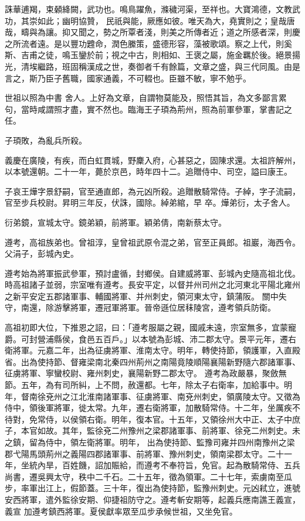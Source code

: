 \begin{pinyinscope}
 誅華逋羯，束顙絳闕，武功也。鳴鳥躍魚，滌穢河渠，至祥也。大寶鴻德，文教武功，其崇如此；幽明協贊，
 民祇與能，厥應如彼。唯天為大，堯實則之；皇哉唐哉，疇與為讓。抑又聞之，勢之所覃者淺，則美之所傳者近；道之所感者深，則慶之所流者遠。是以豐功韙命，潤色縢策，盛德形容，藻被歌頌。察之上代，則奚斯、吉甫之徒，鳴玉鑾於前；視之中古，則相如、王褒之屬，施金羈於後。絕景揚光，清埃繼路，班固稱漢成之世，奏御者千有餘篇，文章之盛，與三代同風。由是言之，斯乃臣子舊職，國家通義，不可輟也。臣雖不敏，寧不勉乎。



 世祖以照為中書
 舍人。上好為文章，自謂物莫能及，照悟其旨，為文多鄙言累句，當時咸謂照才盡，實不然也。臨海王子頊為荊州，照為前軍參軍，掌書記之任。



 子頊敗，為亂兵所殺。



 義慶在廣陵，有疾，而白虹貫城，野麇入府，心甚惡之，固陳求還。太祖許解州，以本號還朝。二十一年，薨於京邑，時年四十二。追贈侍中、司空，謚曰康王。



 子哀王燁字景舒嗣，官至通直郎，為元凶所殺。追贈散騎常侍。子綽，字子流嗣，官至步兵校尉。昇明三年反，伏誅，國除。綽弟綰，早
 卒。燁弟衍，太子舍人。



 衍弟鏡，宣城太守。鏡弟穎，前將軍。穎弟倩，南新蔡太守。



 遵考，高祖族弟也。曾祖淳，皇曾祖武原令混之弟，官至正員郎。祖巖，海西令。父涓子，彭城內史。



 遵考始為將軍振武參軍，預討盧循，封鄉侯。自建威將軍、彭城內史隨高祖北伐。時高祖諸子並弱，宗室唯有遵考。長安平定，以督并州司州之北河東北平陽北雍州之新平安定五郡諸軍事、輔國將軍、并州刺史，領河東太守，鎮蒲阪。
 關中失守，南還，除游擊將軍，遷冠軍將軍。晉帝遜位居秣陵宮，遵考領兵防衛。



 高祖初即大位，下推恩之詔，曰：「遵考服屬之親，國戚未遠，宗室無多，宜蒙寵爵。可封營浦縣侯，食邑五百戶。」以本號為彭城、沛二郡太守。景平元年，遷右衛將軍。元嘉二年，出為征虜將軍、淮南太守。明年，轉使持節，領護軍，入直殿省。出為使持節、督雍梁南北秦四州荊州之南陽竟陵順陽襄陽新野隨六郡諸軍事、征虜將軍、寧蠻校尉、雍州刺史，襄陽新野二郡太守。
 遵考為政嚴暴，聚斂無節。五年，為有司所糾，上不問，赦還都。七年，除太子右衛率，加給事中。明年，督南徐兗州之江北淮南諸軍事、征虜將軍、南兗州刺史，領廣陵太守。又徵為侍中，領後軍將軍，徙太常。九年，遷右衛將軍，加散騎常侍。十二年，坐厲疾不待對，免常侍，以侯領右衛。明年，復本官。十五年，又領徐州大中正、太子中庶子，本官如故。其年，監徐兗二州豫州之梁郡諸軍事、前將軍、徐兗二州刺史。未之鎮，留為侍中，領左衛將軍。明年，
 出為使持節、監豫司雍并四州南豫州之梁郡弋陽馬頭荊州之義陽四郡諸軍事、前將軍、豫州刺史，領南梁郡太守。二十一年，坐統內旱，百姓饑，詔加賑給，而遵考不奉符旨，免官。起為散騎常侍、五兵尚書，遷吳興太守，秩中二千石。二十五年，徵為領軍。二十七年，索虜南至瓜步，率軍出江上，假節蓋。三十年，復出為使持節，監豫州刺史。元凶弒立，進號安西將軍，遣外監徐安期、仰捷祖防守之。遵考斬安期等，起義兵應南譙王義宣，義宣
 加遵考鎮西將軍。夏侯獻率眾至瓜步承候世祖，又坐免官。




\end{pinyinscope}
